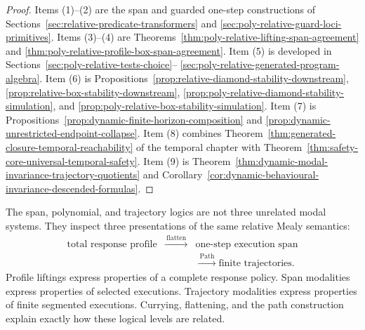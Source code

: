 \begin{proof}
Items (1)--(2) are the span and guarded one-step constructions of
Sections~\ref{sec:relative-predicate-transformers} and
\ref{sec:poly-relative-guard-loci-primitives}.  Items (3)--(4) are
Theorems~\ref{thm:poly-relative-lifting-span-agreement} and
\ref{thm:poly-relative-profile-box-span-agreement}.  Item (5) is developed in
Sections~\ref{sec:poly-relative-tests-choice}--
\ref{sec:poly-relative-generated-program-algebra}.  Item (6) is
Propositions~\ref{prop:relative-diamond-stability-downstream},
\ref{prop:relative-box-stability-downstream},
\ref{prop:poly-relative-diamond-stability-simulation}, and
\ref{prop:poly-relative-box-stability-simulation}.  Item (7) is
Propositions~\ref{prop:dynamic-finite-horizon-composition} and
\ref{prop:dynamic-unrestricted-endpoint-collapse}.  Item (8) combines
Theorem~\ref{thm:generated-closure-temporal-reachability} of the temporal
chapter with Theorem~\ref{thm:safety-core-universal-temporal-safety}.  Item
(9) is Theorem~\ref{thm:dynamic-modal-invariance-trajectory-quotients} and
Corollary~\ref{cor:dynamic-behavioural-invariance-descended-formulas}.
\end{proof}

\begin{remark}
\label{rem:dynamic-response-trajectory-final-summary}
The span, polynomial, and trajectory logics are not three unrelated modal
systems.  They inspect three presentations of the same relative Mealy
semantics:
\[
\begin{array}{ccl}
\text{total response profile}
&\xrightarrow{\ \text{flatten}\ }&
\text{one-step execution span}\\
&&\xrightarrow{\ \operatorname{Path}\ }
\text{finite trajectories}.
\end{array}
\]
Profile liftings express properties of a complete response policy.  Span
modalities express properties of selected executions.  Trajectory modalities
express properties of finite segmented executions.  Currying, flattening, and
the path construction explain exactly how these logical levels are related.
\end{remark}
